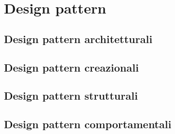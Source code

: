 \documentclass[../SpecificaTecnica.tex]{subfiles}
\begin{document}
\section{Design pattern}
	\subsection{Design pattern architetturali}
	\subsection{Design pattern creazionali}
	\subsection{Design pattern strutturali}
	\subsection{Design pattern comportamentali}
\end{document}
